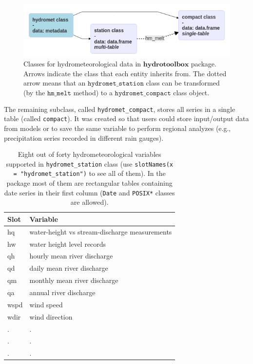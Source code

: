 \begin{figure}

{\centering \includegraphics[width=0.7\linewidth]{./flow_diagram_classes_crop} 

}

\caption{Classes for hydrometeorological data in $\textbf{hydrotoolbox}$ package. Arrows indicate the class that each entity inherits from. The dotted arrow means that an $\texttt{hydromet\_station}$ class can be transformed (by the $\texttt{hm\_melt}$ method) to a  $\texttt{hydromet\_compact}$ class object.}\label{fig:class-htb}
\end{figure}

\noindent 
The remaining subclass, called \texttt{hydromet\_compact}, stores all
series in a single table (called \texttt{compact}). It was created so that
users could store input/output data from models or to save the same
variable to perform regional analyzes (e.g., precipitation series
recorded in different rain gauges).

\begin{table}

\caption{\label{tab:table-variables-static}Eight out of forty hydrometeorological variables supported in \texttt{hydromet\_station} class (use \texttt{slotNames(x = "hydromet\_station")} to see all of them). In the package most of them are rectangular tables containing date series in their first column (\texttt{Date} and \texttt{POSIX*} classes are allowed).}
\centering
\fontsize{9}{11}\selectfont
\begin{tabular}[t]{ll}
\toprule
\textbf{Slot} & \textbf{Variable}\\
\midrule
hq & water-height vs stream-discharge measurements\\
hw & water height level records\\
qh & hourly mean river discharge\\
qd & daily mean river discharge\\
qm & monthly mean river discharge\\
\addlinespace
qa & annual river discharge\\
wspd & wind speed\\
wdir & wind direction\\
. & \vphantom{2} .\\
. & \vphantom{1} .\\
\addlinespace
. & .\\
\bottomrule
\end{tabular}
\end{table}

